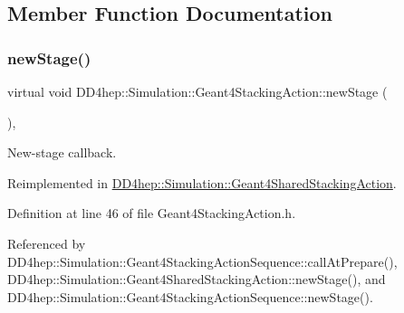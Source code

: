 \subsection{Member Function Documentation}
\hypertarget{class_d_d4hep_1_1_simulation_1_1_geant4_stacking_action_a2709ba86b13b0574dcd1d8e580209d0b}{}\label{class_d_d4hep_1_1_simulation_1_1_geant4_stacking_action_a2709ba86b13b0574dcd1d8e580209d0b} 
\subsubsection{\texorpdfstring{new\+Stage()}{newStage()}}
{\footnotesize\ttfamily virtual void D\+D4hep\+::\+Simulation\+::\+Geant4\+Stacking\+Action\+::new\+Stage (\begin{DoxyParamCaption}{ }\end{DoxyParamCaption})\hspace{0.3cm}{\ttfamily [inline]}, {\ttfamily [virtual]}}



New-\/stage callback. 



Reimplemented in \hyperlink{class_d_d4hep_1_1_simulation_1_1_geant4_shared_stacking_action_af92666552c404908a7e99c8145846c5f}{D\+D4hep\+::\+Simulation\+::\+Geant4\+Shared\+Stacking\+Action}.



Definition at line 46 of file Geant4\+Stacking\+Action.\+h.



Referenced by D\+D4hep\+::\+Simulation\+::\+Geant4\+Stacking\+Action\+Sequence\+::call\+At\+Prepare(), D\+D4hep\+::\+Simulation\+::\+Geant4\+Shared\+Stacking\+Action\+::new\+Stage(), and D\+D4hep\+::\+Simulation\+::\+Geant4\+Stacking\+Action\+Sequence\+::new\+Stage().

\hypertarget{class_d_d4hep_1_1_simulation_1_1_geant4_stacking_action_a3974c0e7b737bdccced8c196fc316b5b}{}\label{class_d_d4hep_1_1_simulation_1_1_geant4_stacking_action_a3974c0e7b737bdccced8c196fc316b5b} 
